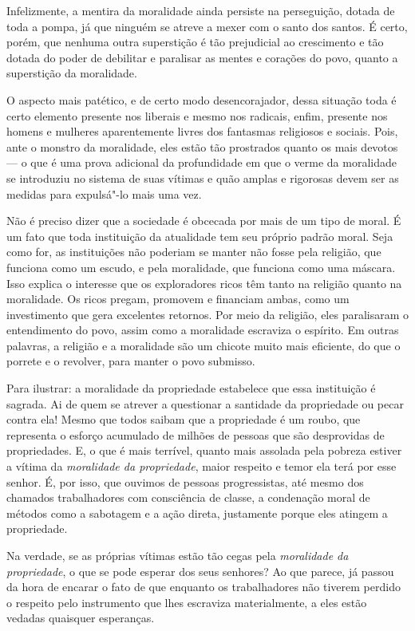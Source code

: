 Infelizmente, a mentira da moralidade ainda persiste na perseguição,
dotada de toda a pompa, já que ninguém se atreve a mexer com o santo dos
santos. É certo, porém, que nenhuma outra superstição é tão prejudicial
ao crescimento e tão dotada do poder de debilitar e paralisar as mentes
e corações do povo, quanto a superstição da moralidade.

O aspecto mais patético, e de certo modo desencorajador, dessa situação
toda é certo elemento presente nos liberais e mesmo nos radicais, enfim,
presente nos homens e mulheres aparentemente livres dos fantasmas
religiosos e sociais. Pois, ante o monstro da moralidade, eles estão tão
prostrados quanto os mais devotos --- o que é uma prova adicional da
profundidade em que o verme da moralidade se introduziu no sistema de
suas vítimas e quão amplas e rigorosas devem ser as medidas para
expulsá"-lo mais uma vez.

Não é preciso dizer que a sociedade é obcecada por mais de um tipo de
moral. É um fato que toda instituição da atualidade tem seu próprio
padrão moral. Seja como for, as instituições não poderiam se manter não\label{ref8}
fosse pela religião, que funciona como um escudo, e pela moralidade, que
funciona como uma máscara. Isso explica o interesse que os exploradores
ricos têm tanto na religião quanto na moralidade. Os ricos pregam,
promovem e financiam ambas, como um investimento que gera excelentes
retornos. Por meio da religião, eles paralisaram o entendimento do povo,
assim como a moralidade escraviza o espírito. Em outras palavras, a
religião e a moralidade são um chicote muito mais eficiente, do que o
porrete e o revolver, para manter o povo submisso.

Para ilustrar: a moralidade da propriedade estabelece que essa
instituição é sagrada. Ai de quem se atrever a questionar a santidade da
propriedade ou pecar contra ela! Mesmo que todos saibam que a
propriedade é um roubo, que representa o esforço acumulado de milhões de
pessoas que são desprovidas de propriedades. E, o que é mais terrível,
quanto mais assolada pela pobreza estiver a vítima da \textit{moralidade da
propriedade}, maior respeito e temor ela terá por esse senhor. É, por
isso, que ouvimos de pessoas progressistas, até mesmo dos chamados
trabalhadores com consciência de classe, a condenação moral de métodos
como a sabotagem e a ação direta, justamente porque eles atingem a
propriedade.

Na verdade, se as próprias vítimas estão tão cegas pela \textit{moralidade da
propriedade}, o que se pode esperar dos seus senhores? Ao que parece, já
passou da hora de encarar o fato de que enquanto os trabalhadores não
tiverem perdido o respeito pelo instrumento que lhes escraviza
materialmente, a eles estão vedadas quaisquer esperanças.

